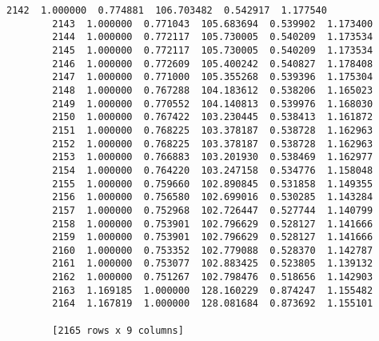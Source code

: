 \documentclass[11pt]{article}
\begin{document}
\begin{Verbatim}[commandchars=\\\{\}]
        2142  1.000000  0.774881  106.703482  0.542917  1.177540  
        2143  1.000000  0.771043  105.683694  0.539902  1.173400  
        2144  1.000000  0.772117  105.730005  0.540209  1.173534  
        2145  1.000000  0.772117  105.730005  0.540209  1.173534  
        2146  1.000000  0.772609  105.400242  0.540827  1.178408  
        2147  1.000000  0.771000  105.355268  0.539396  1.175304  
        2148  1.000000  0.767288  104.183612  0.538206  1.165023  
        2149  1.000000  0.770552  104.140813  0.539976  1.168030  
        2150  1.000000  0.767422  103.230445  0.538413  1.161872  
        2151  1.000000  0.768225  103.378187  0.538728  1.162963  
        2152  1.000000  0.768225  103.378187  0.538728  1.162963  
        2153  1.000000  0.766883  103.201930  0.538469  1.162977  
        2154  1.000000  0.764220  103.247158  0.534776  1.158048  
        2155  1.000000  0.759660  102.890845  0.531858  1.149355  
        2156  1.000000  0.756580  102.699016  0.530285  1.143284  
        2157  1.000000  0.752968  102.726447  0.527744  1.140799  
        2158  1.000000  0.753901  102.796629  0.528127  1.141666  
        2159  1.000000  0.753901  102.796629  0.528127  1.141666  
        2160  1.000000  0.753352  102.779088  0.528370  1.142787  
        2161  1.000000  0.753077  102.883425  0.523805  1.139132  
        2162  1.000000  0.751267  102.798476  0.518656  1.142903  
        2163  1.169185  1.000000  128.160229  0.874247  1.155482  
        2164  1.167819  1.000000  128.081684  0.873692  1.155101  
        
        [2165 rows x 9 columns]
\end{Verbatim}
            
\end{document}
